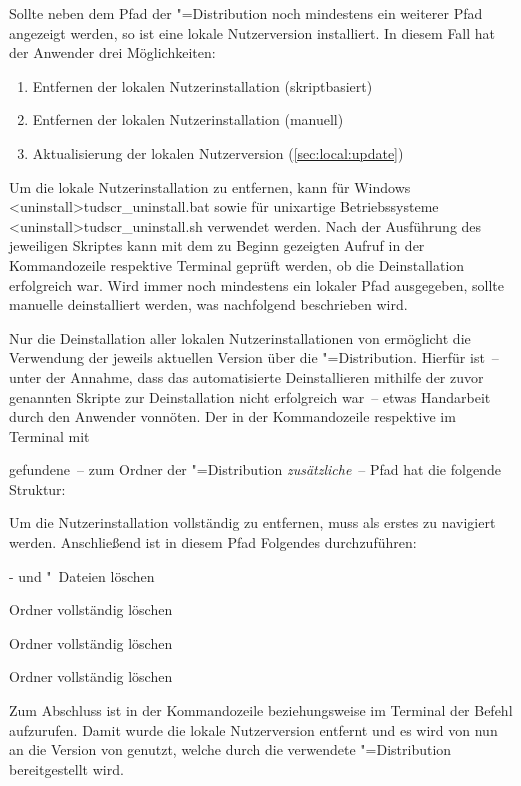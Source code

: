 Sollte neben dem Pfad der "=Distribution noch mindestens ein 
weiterer Pfad angezeigt werden, so ist eine lokale Nutzerversion installiert. 
In diesem Fall hat der Anwender drei Möglichkeiten:
%
\begin{enumerate}
\item Entfernen der lokalen Nutzerinstallation (skriptbasiert)
\item Entfernen der lokalen Nutzerinstallation (manuell)
\item Aktualisierung der lokalen Nutzerversion (\autoref{sec:local:update})
\end{enumerate}
%
Um die lokale Nutzerinstallation zu entfernen, kann für Windows
\GitHubDownload*<uninstall>{tudscr_uninstall.bat} sowie für unixartige 
Betriebssysteme \GitHubDownload*<uninstall>{tudscr_uninstall.sh} verwendet 
werden. Nach der Ausführung des jeweiligen Skriptes kann mit dem zu Beginn 
gezeigten Aufruf in der Kommandozeile respektive Terminal geprüft werden, ob 
die Deinstallation erfolgreich war. Wird immer noch mindestens ein lokaler Pfad 
ausgegeben, sollte \TUDScript manuelle deinstalliert werden, was nachfolgend 
beschrieben wird.

Nur die Deinstallation aller lokalen Nutzerinstallationen von \TUDScript 
ermöglicht die Verwendung der jeweils aktuellen Version über die 
"=Distribution. Hierfür ist~-- unter der Annahme, dass das 
automatisierte Deinstallieren mithilfe der zuvor genannten Skripte zur 
Deinstallation nicht erfolgreich war~-- etwas Handarbeit durch den Anwender 
vonnöten. Der in der Kommandozeile respektive im Terminal mit
%
\begin{quoting}
\end{quoting}
%
gefundene~-- zum Ordner der "=Distribution \emph{zusätzliche}~-- 
Pfad hat die folgende Struktur:
%
\begin{quoting}
\end{quoting}
%
Um die Nutzerinstallation vollständig zu entfernen, muss als erstes zu 
 navigiert werden. Anschließend ist in diesem 
Pfad Folgendes durchzuführen:
%
\settowidth{}%
\begin{description}[labelwidth=\tudscrdim,labelsep=1em]
\item[\Path{tex/latex/tudscr/}]- und "~Dateien löschen
\item[\Path{tex/latex/tudscr/}]Ordner  vollständig löschen
\item[\Path{doc/latex/}] Ordner  vollständig löschen
\item[\Path{source/latex/}] Ordner  vollständig löschen
\end{description}
%
Zum Abschluss ist in der Kommandozeile beziehungsweise im Terminal der Befehl 
 aufzurufen. Damit wurde die lokale Nutzerversion entfernt und es 
wird von nun an die Version von \TUDScript genutzt, welche durch die verwendete 
"=Distribution bereitgestellt wird.



